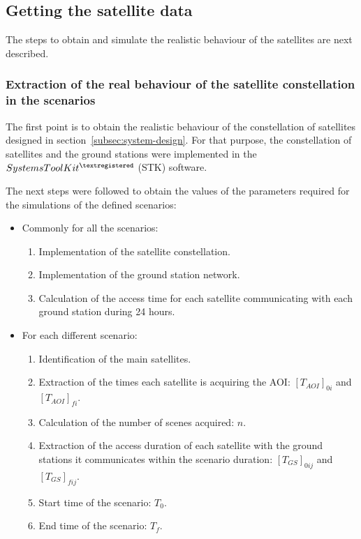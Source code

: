 \subsection{Getting the satellite data}
\label{subsec:getting-satellite-data}

The steps to obtain and simulate the realistic behaviour of the satellites are
next described.


\subsubsection{Extraction of the real behaviour of the satellite constellation
  in the scenarios}
\label{subsubsec:extraction}

The first point is to obtain the realistic behaviour of the constellation of satellites designed in section~\ref{subsec:system-design}.  For that purpose, the constellation of satellites and the ground stations were implemented in the \emph{$Systems Tool Kit^{\textregistered}$} (\acs{STK}) software.

The next steps were followed to obtain the values of the parameters required for the simulations of the defined scenarios:
\begin{itemize}
\item Commonly for all the scenarios:
\begin{enumerate}
\item Implementation of the satellite constellation.
\item Implementation of the ground station network.
\item Calculation of the access time for each satellite communicating with each
  ground station during 24 hours.
\setcounter{enumTemp}{\theenumi}
\end{enumerate}
\item For each different scenario:
\begin{enumerate}
\setcounter{enumi}{\theenumTemp}
\item Identification of the main satellites.
\item Extraction of the times each satellite is acquiring the AOI: $[T_{AOI}]_{0i}$ and $[T_{AOI}]_{fi}$.
\item Calculation of the number of scenes acquired: $n$.
\item Extraction of the access duration of each satellite with the ground stations it communicates within the scenario duration: $[T_{GS}]_{0ij}$ and $[T_{GS}]_{fij}$.
\item Start time of the scenario: $T_0$.
\item End time of the scenario: $T_f$.
\end{enumerate}
\end{itemize}


